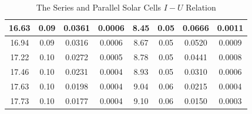 \documentclass[a4paper]{article}
\begin{document}
\begin{table}[H]
\begin{tabular}{|c|c|c|c||c|c|c|c|}
            16.63&0.09&0.0361&0.0006&8.45&0.05&0.0666&0.0011\\\hline
            16.94&0.09&0.0316&0.0006&8.67&0.05&0.0520&0.0009\\\hline
            17.22&0.10&0.0272&0.0005&8.78&0.05&0.0441&0.0008\\\hline
            17.46&0.10&0.0231&0.0004&8.93&0.05&0.0310&0.0006\\\hline
            17.63&0.10&0.0198&0.0004&9.04&0.06&0.0215&0.0004\\\hline
            17.73&0.10&0.0177&0.0004&9.10&0.06&0.0150&0.0003\\\hline
        \end{tabular}
        \caption{The Series and Parallel Solar Cells $I-U$ Relation}
        \label{tab:IVsp}
    \end{table}
\end{document}
